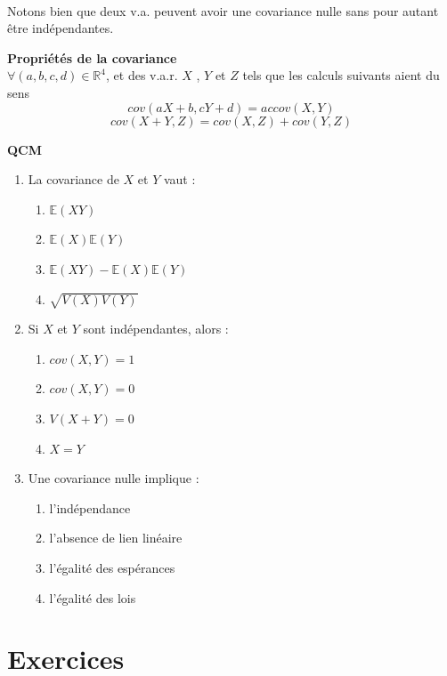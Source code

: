 \documentclass[../PolyS4.tex]{subfiles}
\begin{document}
\begin{Rmq}$\,$

Notons bien que deux v.a. peuvent avoir une covariance nulle sans pour autant être indépendantes. 
\end{Rmq}


\begin{Prop}{\textbf{Propriétés de la covariance}}\\ 
$\forall (a,b,c,d) \in \mathbb R ^4$, et des v.a.r. $X$ , $Y$ et $Z$ tels que les calculs suivants aient du sens \\
$$ cov(aX + b, cY + d) = ac cov(X, Y )$$
$$cov(X + Y,Z) = cov(X,Z) + cov(Y,Z)$$
\end{Prop}


\textbf{QCM}

\begin{enumerate}
\item La covariance de $X$ et $Y$ vaut :
\begin{enumerate}
\item $\mathbb E(XY)$
\item $\mathbb E(X)\mathbb E(Y)$
\item $\mathbb E(XY)-\mathbb E(X)\mathbb E(Y)$
\item $\sqrt{V(X)V(Y)}$
\end{enumerate}

\item Si $X$ et $Y$ sont indépendantes, alors :
\begin{enumerate}
\item $cov(X,Y)=1$
\item $cov(X,Y)=0$
\item $V(X+Y)=0$
\item $X=Y$
\end{enumerate}

\item Une covariance nulle implique :
\begin{enumerate}
\item l'indépendance
\item l'absence de lien linéaire
\item l'égalité des espérances
\item l'égalité des lois
\end{enumerate}
\end{enumerate}


\section{Exercices}
\end{document}
